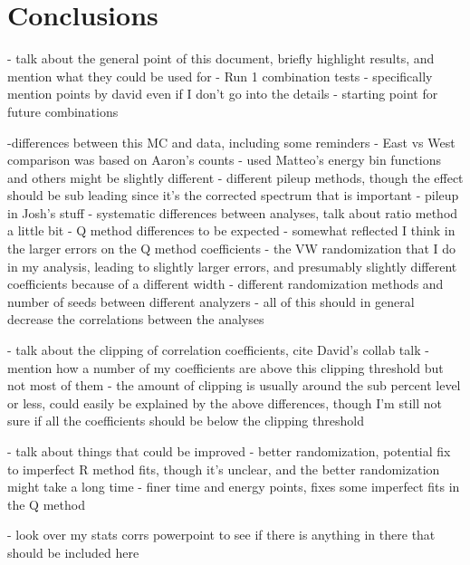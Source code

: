 
\graphicspath{{Body/Figures/}}

\clearpage
\section{Conclusions}

- talk about the general point of this document, briefly highlight results, and mention what they could be used for
	- Run 1 combination tests - specifically mention points by david even if I don't go into the details
	- starting point for future combinations

	


-differences between this MC and data, including some reminders
 - East vs West comparison was based on Aaron's counts
 - used Matteo's energy bin functions and others might be slightly different
 - different pileup methods, though the effect should be sub leading since it's the corrected spectrum that is important
 - pileup in Josh's stuff
 - systematic differences between analyses, talk about ratio method a little bit
 - Q method differences to be expected - somewhat reflected I think in the larger errors on the Q method coefficients
 - the VW randomization that I do in my analysis, leading to slightly larger errors, and presumably slightly different coefficients because of a different width
 - different randomization methods and number of seeds between different analyzers
- all of this should in general decrease the correlations between the analyses

- talk about the clipping of correlation coefficients, cite David's collab talk
	- mention how a number of my coefficients are above this clipping threshold but not most of them
	- the amount of clipping is usually around the sub percent level or less, could easily be explained by the above differences, though I'm still not sure if all the coefficients should be below the clipping threshold


- talk about things that could be improved
	- better randomization, potential fix to imperfect R method fits, though it's unclear, and the better randomization might take a long time
	- finer time and energy points, fixes some imperfect fits in the Q method


- look over my stats corrs powerpoint to see if there is anything in there that should be included here


